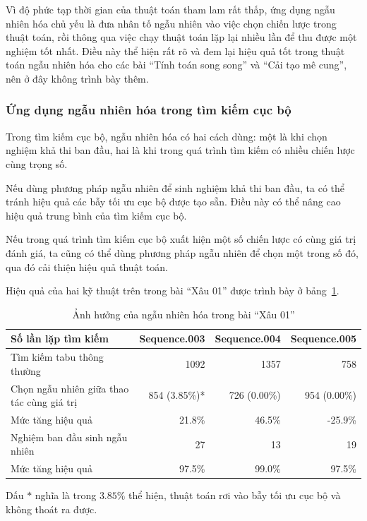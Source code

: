 \documentclass[11pt]{article}
\begin{document}
Vì độ phức tạp thời gian của thuật toán tham lam rất thấp, ứng dụng ngẫu nhiên
hóa chủ yếu là đưa nhân tố ngẫu nhiên vào việc chọn chiến lược trong thuật
toán, rồi thông qua việc chạy thuật toán lặp lại nhiều lần để thu được một
nghiệm tốt nhất. Điều này thể hiện rất rõ và đem lại hiệu quả tốt trong thuật
toán ngẫu nhiên hóa cho các bài ``Tính toán song song'' và ``Cải tạo mê
cung'', nên ở đây không trình bày thêm.

\subsubsection{Ứng dụng ngẫu nhiên hóa trong tìm kiếm cục bộ}

Trong tìm kiếm cục bộ, ngẫu nhiên hóa có hai cách dùng: một là khi chọn nghiệm
khả thi ban đầu, hai là khi trong quá trình tìm kiếm có nhiều chiến lược cùng
trọng số.

Nếu dùng phương pháp ngẫu nhiên để sinh nghiệm khả thi ban đầu, ta có thể
tránh hiệu quả các bẫy tối ưu cục bộ được tạo sẵn. Điều này có thể nâng cao
hiệu quả trung bình của tìm kiếm cục bộ.

Nếu trong quá trình tìm kiếm cục bộ xuất hiện một số chiến lược có cùng giá
trị đánh giá, ta cũng có thể dùng phương pháp ngẫu nhiên để chọn một trong số
đó, qua đó cải thiện hiệu quả thuật toán.

Hiệu quả của hai kỹ thuật trên trong bài ``Xâu 01'' được trình bày ở
bảng~\ref{tab:randomized-01}.

\begin{table}[htbp]
\centering
\small
\begin{tabular}{lrrr}
\hline
Số lần lặp tìm kiếm & Sequence.003 & Sequence.004 & Sequence.005\\
\hline
Tìm kiếm tabu thông thường & 1092 & 1357 & 758\\
Chọn ngẫu nhiên giữa thao tác cùng giá trị & 854 (3.85\%)* & 726 (0.00\%) & 954 (0.00\%)\\
Mức tăng hiệu quả & 21.8\% & 46.5\% & -25.9\%\\
Nghiệm ban đầu sinh ngẫu nhiên & 27 & 13 & 19\\
Mức tăng hiệu quả & 97.5\% & 99.0\% & 97.5\%\\
\hline
\end{tabular}
\caption{Ảnh hưởng của ngẫu nhiên hóa trong bài ``Xâu 01''}
\label{tab:randomized-01}
\end{table}

Dấu \(*\) nghĩa là trong \(3.85\%\) thể hiện, thuật toán rơi vào bẫy tối ưu
cục bộ và không thoát ra được.
\end{document}

